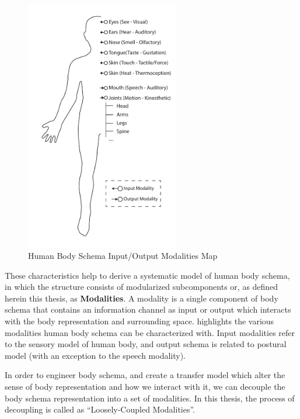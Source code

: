 \begin{figure}[t!]
  \captionsetup{justification=centering}
  \centering
\includegraphics[width=0.6\textwidth]{figures/concept/Modalities.pdf}
\caption{Human Body Schema Input/Output Modalities Map}
  \label{fig:concept-modalities}
\end{figure}

These characteristics help to derive a systematic model of human body schema, in which the structure consists of modularized subcomponents or, as defined herein this thesis, as \textbf{Modalities}. A modality is a single component of body schema that contains an information channel as input or output which interacts with the body representation and surrounding space.  highlights the various modalities human body schema can be characterized with. Input modalities refer to the sensory model of human body, and output schema is related to postural model (with an exception to the speech modality).

In order to engineer body schema, and create a transfer model which alter the sense of body representation and how we interact with it, we can decouple the body schema representation into a set of modalities. In this thesis, the process of decoupling is called as ``Loosely-Coupled Modalities''.

